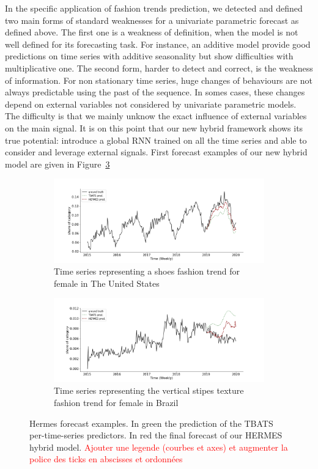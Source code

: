 \documentclass{article} %
\begin{document}
In the specific application of fashion trends prediction, we detected and defined two main forms of standard weaknesses for a univariate parametric forecast as defined above. The first one is a weakness of definition, when the model is not well defined for its forecasting task. For instance, an additive model provide good predictions on time series with additive seasonality but show difficulties with multiplicative one. The second form, harder to detect and correct, is the weakness of information. For non stationary time series, huge changes of behaviours are not always predictable using the past of the sequence. In somes cases, these changes depend on external variables not considered by univariate parametric models. The difficulty is that we mainly unknow the exact influence of external variables on the main signal. It is on this point that our new hybrid framework shows its true potential: introduce a global RNN trained on all the time series and able to consider and leverage external signals. First forecast examples of our new hybrid model are given in Figure~\ref{fig:introexamples}

\medskip

\begin{figure}
\centering
\begin{subfigure}{1.\textwidth}
  \centering
  \includegraphics[width=1.\linewidth]{figure/us_female_shoes}
  \caption{Time series representing a shoes fashion trend for female in The United States}
  \label{fig:introexamples:sub1}
\end{subfigure}
\begin{subfigure}{1.\textwidth}
  \centering
  \includegraphics[width=1.\linewidth]{figure/br_female_texture_verticalstripe}
  \caption{Time series representing the vertical stipes texture fashion trend for female in Brazil}
  \label{fig:introexamples:sub2}
\end{subfigure}
\caption{Hermes forecast examples. In green the prediction of the TBATS per-time-series predictors. In red the final forecast of our HERMES hybrid model. \textcolor{red}{Ajouter une legende (courbes et axes) et augmenter la police des ticks en abscisses et ordonnées}}
\label{fig:introexamples}
\end{figure}
\end{document}
